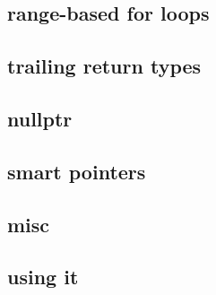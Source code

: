 \subsection{range-based for loops}

\subsection{trailing return types}

\subsection{nullptr}

\subsection{smart pointers}

\subsection{misc}

\subsection{using it}

